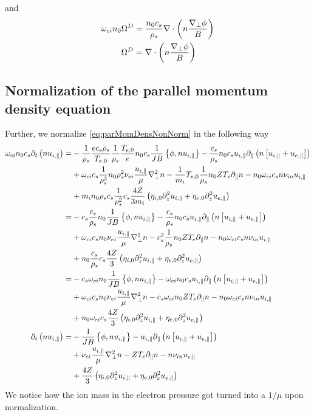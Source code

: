 %
and
%
\begin{align*}
    \omega_{ci}n_0\Omega^D &= \frac{n_0 c_s}{\rho_s}\nabla\cdot\left(n\frac{\nabla_\perp\phi}{B}\right)\\
    \Omega^D &= \nabla\cdot\left(n\frac{\nabla_\perp\phi}{B}\right)
\end{align*}
%

\subsection{Normalization of the parallel momentum density equation}
%
Further, we normalize \cref{eq:parMomDensNonNorm} in the following way
%
\begin{align*}
    \omega_{ci}n_0c_s\partial_t\left( n u_{i,\|}\right)
 =&
 -\frac{1}{\rho_s}\frac{ec_s\rho_s}{T_{e,0}}\frac{1}{\rho_s}\frac{T_{e,0}}{e}n_0c_s\frac{1}{JB}\left\{\phi, n u_{i,\|}\right\}
 - \frac{c_s}{\rho_s}n_0c_s u_{i,\|}\partial_\|\left( n \left[u_{i,\|}+ u_{e,\|} \right]\right)
   \\&
 + \omega_{ci}c_s\frac{1}{\rho_s^2}n_0\rho_s^2\nu_{ei} \frac{u_{i,\|}}{\mu} \nabla_\perp^2 n
 - \frac{1}{m_i}T_{e,0}\frac{1}{\rho_s}n_0ZT_e \partial_\| n
 - n_0\omega_{ci}c_s n \nu_{i n}u_{i,\|}
   \\&
   + m_in_0\rho_sc_s\frac{1}{\rho_s^2}c_s\frac{4Z}{3m_i}\left(\eta_{i,0} \partial_z^2 u_{i,\|}
 + \eta_{e,0}\partial_z^2 u_{e,\|}\right)
 \\
 =&
 - c_s\frac{c_s}{\rho_s}n_0\frac{1}{JB}\left\{\phi, n u_{i,\|}\right\}
 - \frac{c_s}{\rho_s}n_0c_s u_{i,\|}\partial_\|\left( n \left[u_{i,\|}+ u_{e,\|} \right]\right)
   \\&
 + \omega_{ci}c_sn_0\nu_{ei} \frac{u_{i,\|}}{\mu} \nabla_\perp^2 n
 - c_s^2\frac{1}{\rho_s}n_0ZT_e \partial_\| n
 - n_0\omega_{ci}c_s n \nu_{i n}u_{i,\|}
   \\&
   + n_0\frac{c_s}{\rho_s}c_s\frac{4Z}{3}\left(\eta_{i,0} \partial_z^2 u_{i,\|}
 + \eta_{e,0}\partial_z^2 u_{e,\|}\right)
 \\
 =&
 - c_s\omega_{ci}n_0\frac{1}{JB}\left\{\phi, n u_{i,\|}\right\}
 - \omega_{ci}n_0c_s u_{i,\|}\partial_\|\left( n \left[u_{i,\|}+ u_{e,\|} \right]\right)
   \\&
 + \omega_{ci}c_sn_0\nu_{ei} \frac{u_{i,\|}}{\mu} \nabla_\perp^2 n
 - c_s\omega_{ci}n_0ZT_e \partial_\| n
 - n_0\omega_{ci}c_s n \nu_{i n}u_{i,\|}
   \\&
   + n_0\omega_{ci}c_s\frac{4Z}{3}\left(\eta_{i,0} \partial_z^2 u_{i,\|}
 + \eta_{e,0}\partial_z^2 u_{e,\|}\right)
 \\
  \partial_t\left( n u_{i,\|}\right)
 =&
 - \frac{1}{JB}\left\{\phi, n u_{i,\|}\right\}
 - u_{i,\|}\partial_\|\left( n \left[u_{i,\|}+ u_{e,\|} \right]\right)
   \\&
 + \nu_{ei} \frac{u_{i,\|}}{\mu} \nabla_\perp^2 n
 - ZT_e \partial_\| n
 - n \nu_{i n}u_{i,\|}
   \\&
   + \frac{4Z}{3}\left(\eta_{i,0} \partial_z^2 u_{i,\|}
 + \eta_{e,0}\partial_z^2 u_{e,\|}\right)
\end{align*}
%
We notice how the ion mass in the electron pressure got turned into a $1/\mu$ upon normalization.

